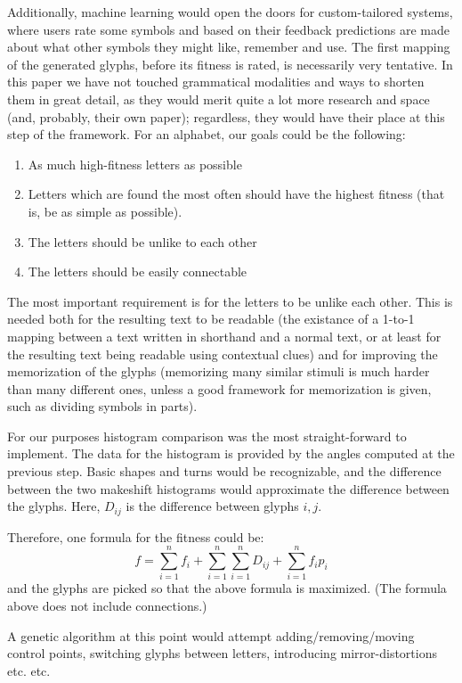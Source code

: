 \documentclass[conference]{IEEEtran}
\begin{document}
Additionally, machine learning would open the doors for custom-tailored systems, where users rate some symbols and based on their feedback predictions are made about what other symbols they might like, remember and use. 
The first mapping of the generated glyphs, before its fitness is rated, is necessarily very tentative. In this paper we have not touched grammatical modalities and ways to shorten them in great detail, as they would merit quite a lot more research and space (and, probably, their own paper); regardless, they would have their place at this step of the framework. 
For an alphabet, our goals could be the following:
\begin{enumerate}
        \item As much high-fitness letters as possible
        \item Letters which are found the most often should have the highest fitness (that is, be as simple as possible).
        \item The letters should be unlike to each other
        \item The letters should be easily connectable
\end{enumerate}

The most important requirement is for the letters to be unlike each other. This is needed both for the resulting text to be readable (the existance of a 1-to-1 mapping between a text written in shorthand and a normal text, or at least for the resulting text being readable using contextual clues) and for improving the memorization of the glyphs (memorizing many similar stimuli is much harder than many different ones, unless a good framework for memorization is given, such as dividing symbols in parts). 

For our purposes histogram comparison was the most straight-forward to implement. The data for the histogram is provided by the angles computed at the previous step. Basic shapes and turns would be recognizable, and the difference between the two makeshift histograms would approximate the difference between the glyphs. Here, \(D_{ij}\) is the difference between glyphs \(i, j\).

Therefore, one formula for the fitness could be:
\[
f=\sum^{n}_{i=1}f_i+
\sum^{n}_{i=1}\sum^{n}_{i=1}D_{ij}+
\sum^{n}_{i=1}f_ip_i
\]
and the glyphs are picked so that the above formula is maximized. (The formula above does not include connections.)

A genetic algorithm at this point would attempt adding/removing/moving control points, switching glyphs between letters, introducing mirror-distortions etc. etc.
\end{document}
